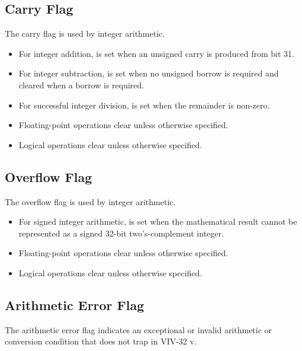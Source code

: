 \subsection{Carry Flag}

The carry flag  is used by integer arithmetic.

\begin{itemize}
\item For integer addition,  is set when an unsigned carry is produced
from bit 31.
\item For integer subtraction,  is set when no unsigned borrow is
required and cleared when a borrow is required.
\item For successful integer division,  is set when the remainder is
non-zero.
\item Floating-point operations clear  unless otherwise specified.
\item Logical operations clear  unless otherwise specified.
\end{itemize}

\subsection{Overflow Flag}

The overflow flag  is used by integer arithmetic.

\begin{itemize}
\item For signed integer arithmetic,  is set when the mathematical
result cannot be represented as a signed 32-bit two's-complement integer.
\item Floating-point operations clear  unless otherwise specified.
\item Logical operations clear  unless otherwise specified.
\end{itemize}

\subsection{Arithmetic Error Flag}

The arithmetic error flag  indicates an exceptional or invalid
arithmetic or conversion condition that does not trap in VIV-32 v\version{}.

